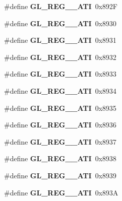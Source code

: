 \begin{DoxyCompactItemize}
\item 
\#define {\bfseries G\+L\+\_\+\+R\+E\+G\+\_\+\_\+\+A\+T\+I}~0x892\+F\label{_s_d_l__opengl_8h_ac6542b74df9851e8661f22159dc0517f}

\item 
\#define {\bfseries G\+L\+\_\+\+R\+E\+G\+\_\+\_\+\+A\+T\+I}~0x8930\label{_s_d_l__opengl_8h_add3ff7a479e2364fd305df285a5fb8e8}

\item 
\#define {\bfseries G\+L\+\_\+\+R\+E\+G\+\_\+\_\+\+A\+T\+I}~0x8931\label{_s_d_l__opengl_8h_a8a459e2556c46c002b309d791a5939bf}

\item 
\#define {\bfseries G\+L\+\_\+\+R\+E\+G\+\_\+\_\+\+A\+T\+I}~0x8932\label{_s_d_l__opengl_8h_af10d88dcc0e0490b03f5b426981944e2}

\item 
\#define {\bfseries G\+L\+\_\+\+R\+E\+G\+\_\+\_\+\+A\+T\+I}~0x8933\label{_s_d_l__opengl_8h_a6634fb7a0c9f68c4713f917f9a73ce3a}

\item 
\#define {\bfseries G\+L\+\_\+\+R\+E\+G\+\_\+\_\+\+A\+T\+I}~0x8934\label{_s_d_l__opengl_8h_a7e938dc1b7763fb8604fb63472b477f8}

\item 
\#define {\bfseries G\+L\+\_\+\+R\+E\+G\+\_\+\_\+\+A\+T\+I}~0x8935\label{_s_d_l__opengl_8h_a16eb5eaddc4c27855fa3541350072f68}

\item 
\#define {\bfseries G\+L\+\_\+\+R\+E\+G\+\_\+\_\+\+A\+T\+I}~0x8936\label{_s_d_l__opengl_8h_a821432c444b4fcbb9f52a64bd8a75b55}

\item 
\#define {\bfseries G\+L\+\_\+\+R\+E\+G\+\_\+\_\+\+A\+T\+I}~0x8937\label{_s_d_l__opengl_8h_a10b91364edfd1e60b4ddb72763ff94a6}

\item 
\#define {\bfseries G\+L\+\_\+\+R\+E\+G\+\_\+\_\+\+A\+T\+I}~0x8938\label{_s_d_l__opengl_8h_ae01296918010a0e8a4b507a4cdc7c47d}

\item 
\#define {\bfseries G\+L\+\_\+\+R\+E\+G\+\_\+\_\+\+A\+T\+I}~0x8939\label{_s_d_l__opengl_8h_ad54d4bda4fbc2921b3b6a5edc2f892a5}

\item 
\#define {\bfseries G\+L\+\_\+\+R\+E\+G\+\_\+\_\+\+A\+T\+I}~0x893\+A\label{_s_d_l__opengl_8h_ad2f7149bedb32fce1ad327f3b29abd8a}


\end{DoxyCompactItemize}
